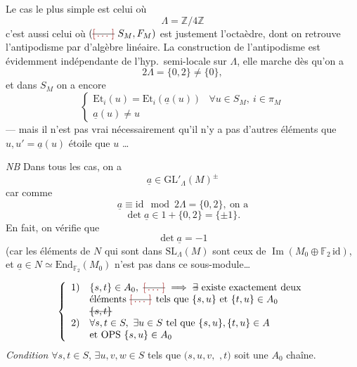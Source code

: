 \documentclass[11pt,a4paper]{article}
\begin{document}
 Le cas le plus simple est celui où
\[
\Lambda=\mathbb{Z}/4\mathbb{Z}
\]
c'est aussi celui où $(\text{\struck{\ill{}}}\ S_M,F_M)$ est justement l'octaèdre, dont on retrouve
l'antipodisme par   d'algèbre linéaire.
 La construction de
l'antipodisme est évidemment indépendante de l'hyp.\ semi-locale sur $\Lambda$, elle marche dès qu'on a
\[
2\Lambda=\{0,2\}\neq\{0\},
\]
et dans $S_M$ on a encore
\[
\begin{cases}
\mathrm{Et}_i(u)=\mathrm{Et}_i(\underline{a}(u)) & \forall u\in S_M,\ i\in\pi_M\\
\underline{a}(u)\neq u
\end{cases}
\]
--- mais il n'est pas vrai nécessairement qu'il n'y a pas d'autres éléments que
$u,u'=\underline{a}(u)$  étoile que $u$ \ldots\ 

\emph{NB} Dans tous les cas, on a
\[
\underline{a}\in\mathrm{GL}'_\Lambda(M)^{\pm}
\]
car comme
\[
\underline{a}\equiv\mathrm{id}\mod 2\Lambda=\{0,2\},\ \text{on a}
\]
\[
\det\underline{a}\in1+\{0,2\}=\{\pm1\} .
\]
En fait, on vérifie que
\[
\det\underline{a}=-1
\]
(car les éléments de $N$ qui sont dans $\mathrm{SL}_\Lambda(M)$ sont ceux de
$\operatorname{Im}(M_0\oplus\mathbb{F}_2\,\mathrm{id})$, et $\underline{a}\in N\simeq\mathrm{End}_{\mathbb{F}_2}(M_0)$
n'est pas dans ce sous-module\ldots

\[
\left\{
\begin{array}{ll}
1) & \{s,t\}\in A_0,\ \text{\struck{\ill{}}}\ \Longrightarrow\ \text{\struck{$\exists$}} \text{ existe exactement deux}\\
 & \text{éléments \struck{\ill{}} tels que } \{s,u\} \text{ et } \{t,u\}\in A_0\\
 & \text{\struck{$\{s,t\}$}}\\
2) & \forall s,t\in S,\ \exists u\in S \text{ tel que } \{s,u\},\{t,u\}\in A\\
 & \text{et OPS } \{s,u\}\in A_0
\end{array}
\right.
\]
 \emph{Condition} $\forall s,t\in S$, $\exists u,v,w\in S$ tels que
$(s,u,v,$ $,t)$ soit une $A_0$ chaîne.

\end{document}
